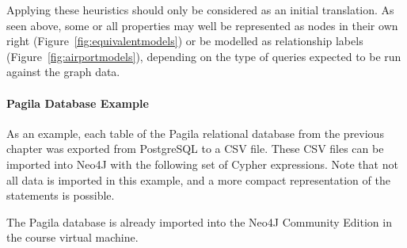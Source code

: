 Applying these heuristics should only be considered as an initial translation. As seen above, some or all properties may well be represented as nodes in their own right (Figure~\ref{fig:equivalentmodels}) or be modelled as relationship labels (Figure~\ref{fig:airportmodels}), depending on the type of queries expected to be run against the graph data.

\paragraph*{Pagila Database Example} As an example, each table of the Pagila relational database from the previous chapter was exported from PostgreSQL to a CSV file. These CSV files can be imported into Neo4J with the following set of Cypher expressions. Note that not all data is imported in this example, and a more compact representation of the statements is possible. 

\begin{tcolorbox}[colback=alert]
The Pagila database is already imported into the Neo4J Community Edition in the course virtual machine.
\end{tcolorbox}

\FloatBarrier

